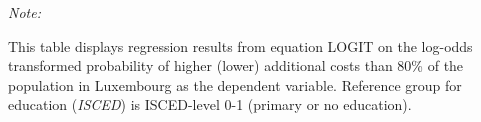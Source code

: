 \begin{table}[htbp!]
\begin{adjustbox}{width = 1\textwidth, max height = 0.95\textheight, center}
\begin{threeparttable}[b]
         \begin{tablenotes}\item \medskip \textit{Note:}
            \item This table displays regression results from equation LOGIT on the log-odds transformed probability of higher (lower) additional costs than 80\% of the population in Luxembourg as the dependent variable. Reference group for education (\textit{ISCED}) is ISCED-level 0-1 (primary or no education).
         \end{tablenotes}
      \end{threeparttable}
   \end{adjustbox}
\end{table}



